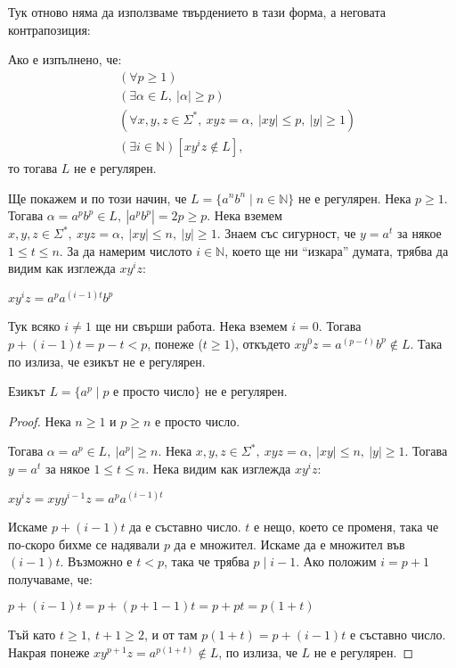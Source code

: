 Тук отново няма да използваме твърдението в тази форма, а неговата контрапозиция:

\begin{corollary}
    Ако е изпълнено, че:
    \begin{align*}
         & (\forall p \geq 1)                                                             \\
         & (\exists \alpha \in L, \: |\alpha| \geq p)                                     \\
         & (\forall x, y, z \in \Sigma^*, \: xyz = \alpha, \: |xy| \leq p, \: |y| \geq 1) \\
         & (\exists i \in \mathbb{N}) [xy^iz \notin L],
    \end{align*}
    то тогава $L$ не е регулярен.
\end{corollary}

Ще покажем и по този начин, че $L = \{ a^nb^n \mid n \in \mathbb{N} \}$ не е регулярен.
Нека $p \geq 1$.
Тогава $\alpha = a^pb^p \in L, \: |a^pb^p| = 2p \geq p$.
Нека вземем $x, y, z \in \Sigma^*, \: xyz = \alpha, \: |xy| \leq n, \: |y| \geq 1$.
Знаем със сигурност, че $y = a^t$ за някое $1 \leq t \leq n$.
За да намерим числото $i \in \mathbb{N}$, което ще ни ``изкара'' думата, трябва да видим как изглежда $xy^iz$:
\begin{center}
    $xy^iz = a^pa^{(i - 1)t}b^p$
\end{center}
Тук всяко $i \neq 1$ ще ни свърши работа.
Нека вземем $i = 0$.
Тогава $p + (i - 1)t = p - t < p$, понеже ($t \geq 1$), откъдето $xy^0z = a^{(p - t)}b^p \notin L$.
Така по  излиза, че езикът не е регулярен.

\begin{claim}
    Езикът $L = \{ a^p \mid p \text{ е просто число} \}$ не е регулярен.
\end{claim}

\begin{proof}
    Нека $n \geq 1$ и $p \geq n$ е просто число.

    Тогава $\alpha = a^p \in L, \: |a^p| \geq n$.
    Нека $x, y, z \in \Sigma^*, \: xyz = \alpha, \: |xy| \leq n, \: |y| \geq 1$.
    Тогава $y = a^t$ за някое $1 \leq t \leq n$.
    Нека видим как изглежда $xy^iz$:
    \begin{center}
        $xy^iz = xyy^{i - 1}z = a^pa^{(i - 1)t}$
    \end{center}
    Искаме $p + (i - 1)t$ да е съставно число.
    $t$ е нещо, което се променя, така че по-скоро бихме се надявали $p$ да е множител.
    Искаме да е множител във $(i - 1)t$. Възможно е $t < p$, така че трябва $p \mid i - 1$.
    Ако положим $i = p + 1$ получаваме, че:
    \begin{center}
        $p + (i - 1)t = p + (p + 1 - 1)t = p + pt = p(1 + t)$
    \end{center}
    Тъй като $t \geq 1, \: t + 1 \geq 2$, и от там $p(1 + t) = p + (i - 1)t$ е съставно число.
    Накрая понеже $xy^{p + 1}z = a^{p(1 + t)} \notin L$, по  излиза, че $L$ не е регулярен.
\end{proof}


